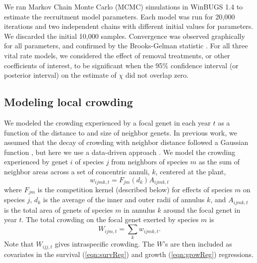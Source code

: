\documentclass[11pt]{article}
\begin{document}
We ran Markov Chain Monte Carlo (MCMC) simulations in WinBUGS 1.4 \citep{lunn_winbugs_2000} to estimate the recruitment model parameters. Each model was run for 20,000 iterations and two independent chains with different initial values for parameters. We discarded the initial 10,000 samples. Convergence was observed graphically for all parameters, and confirmed by the Brooks-Gelman statistic \citep{brooks_general_1998}. For all three vital rate models, we considered the effect of removal treatments, or other coefficients of interest, to be significant when the 95\% confidence interval (or posterior interval) on the estimate of $\chi$ did not overlap zero.  

\subsection*{Modeling local crowding}

We modeled the crowding experienced by a focal genet in each year $t$ as a function of the distance to and size of neighbor genets. In previous work, 
we assumed that the decay of crowding with neighbor distance followed a Gaussian function \citep{chu_large_2015}, but here we use a data-driven 
approach \citep{teller_linking_2016}. We model the crowding experienced by genet $i$ of species $j$ from neighbors of species $m$ as the sum of neighbor 
areas across a set of concentric annuli, $k$, centered at the plant,
\begin{equation}
w_{ijmk,t} = F_{jm}(d_{k})A_{ijmk,t}     
\label{eqn:wik}
\end{equation}
where $F_{jm}$ is the competition kernel (described below) for effects of species $m$ on species $j$, 
$d_{k}$ is the average of the inner and outer radii of annulus $k$, 
and $A_{ijmk,t}$ is the total area of genets of species $m$ in annulus $k$ around the focal genet in year $t$. The total crowding on 
the focal genet exerted by species $m$ is
\begin{equation}
W_{ijm,t}  =\sum_k {w_{ijmk,t}} .
\label{eqn:wijm}
\end{equation} 
Note that $W_{ijj,t}$ gives intraspecific crowding. The $W$'s are then 
included as covariates in the survival (\ref{eqn:survReg}) and growth (\ref{eqn:growReg}) regressions.
\end{document}
